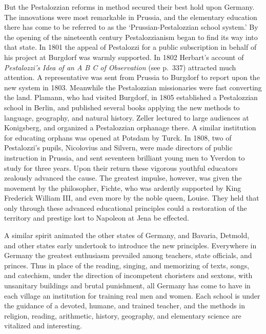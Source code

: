 \documentclass[]{book}
\begin{document}
But the Pestalozzian reforms in method secured their best hold upon Germany. The innovations were most remarkable in Prussia, and the elementary education there has come to be referred to as the `Prussian-Pestalozzian school system.' By the opening of the nineteenth century Pestalozzianism began to find its way into that state. In 1801 the appeal of Pestalozzi for a public subscription in behalf of his project at Burgdorf was warmly supported. In 1802 Herbart's account of \emph{Pestalozzi's Idea of an A B C of Observation} (see p.~337) attracted much attention. A representative was sent from Prussia to Burgdorf to report upon the new system in 1803. Meanwhile the Pestalozzian missionaries were fast converting the land. Plamann, who had visited Burgdorf, in 1805 established a Pestalozzian school in Berlin, and published several books applying the new methods to language, geography, and natural history. Zeller lectured to large audiences at Konigsberg, and organized a Pestalozzian orphanage there. A similar institution for educating orphans was opened at Potsdam by Turck. In 1808, two of Pestalozzi's pupils, Nicolovius and Silvern, were made directors of public instruction in Prussia, and sent seventeen brilliant young men to Yverdon to study for three years. Upon their return these vigorous youthful educators zealously advanced the cause. The greatest impulse, however, was given the movement by the philosopher, Fichte, who was ardently supported by King Frederick William III, and even more by the noble queen, Louise. They held that only through these advanced educational principles could a restoration of the territory and prestige lost to Napoleon at Jena be effected.

A similar spirit animated the other states of Germany, and Bavaria, Detmold, and other states early undertook to introduce the new principles. Everywhere in Germany the greatest enthusiasm prevailed among teachers, state officials, and princes. Thus in place of the reading, singing, and memorizing of texts, songs, and catechism, under the direction of incompetent choristers and sextons, with unsanitary buildings and brutal punishment, all Germany has come to have in each village an institution for training real men and women. Each school is under the guidance of a devoted, humane, and trained teacher, and the methods in religion, reading, arithmetic, history, geography, and elementary science are vitalized and interesting.
\end{document}
